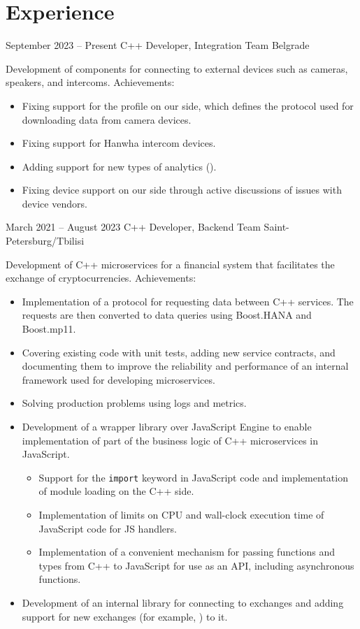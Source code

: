 \documentclass[11pt,a4paper,sans]{moderncv}
\begin{document}
\makecvtitle

\section{Experience}
\cventry
{September 2023 -- Present}
{C++ Developer, Integration Team}
{}
{Belgrade}
{}
{Development of components for connecting to external devices such as cameras, speakers, and intercoms.\newline{}
Achievements:
\begin{itemize}
\item Fixing support for the  profile on our side, which defines the protocol used for downloading data from camera devices.
\item Fixing support for Hanwha intercom devices.
\item Adding support for new types of analytics ().
\item Fixing device support on our side through active discussions of issues with device vendors.
\end{itemize}}

\cventry
{March 2021 -- August 2023}
{C++ Developer, Backend Team}
{}
{Saint-Petersburg/Tbilisi}
{}
{Development of C++ microservices for a financial system that facilitates the exchange of cryptocurrencies.\newline{}
Achievements:
\begin{itemize}
\item Implementation of a protocol for requesting data between C++ services. The requests are then converted to data queries using Boost.HANA and Boost.mp11.
\item Covering existing code with unit tests, adding new service contracts, and documenting them to improve the reliability and performance of an internal framework used for developing microservices.
\item Solving production problems using logs and metrics.
\item Development of a wrapper library over  JavaScript Engine to enable implementation of part of the business logic of C++ microservices in JavaScript.
  \begin{itemize}
  \item Support for the \texttt{import} keyword in JavaScript code and implementation of module loading on the C++ side.
  \item Implementation of limits on CPU and wall-clock execution time of JavaScript code for JS handlers.
  \item Implementation of a convenient mechanism for passing functions and types from C++ to JavaScript for use as an API, including asynchronous functions.
  \end{itemize}
\item Development of an internal library for connecting to exchanges and adding support for new exchanges (for example, ) to it.
\end{itemize}}
\end{document}
